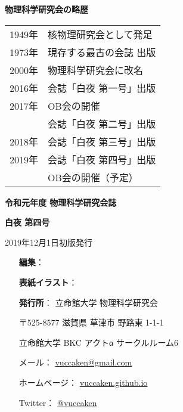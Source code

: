 \documentclass[10pt,b5paper,papersize,dvipdfmx]{jsbook}
\begin{document}

\markboth{}{} %
\clearpage %

\noindent
{\large \bfseries 物理科学研究会の略歴}
\begin{table}[H]
  \begin{tabular}{ll}
    1949年 & 核物理研究会として発足 \\
    1973年 & 現存する最古の会誌 出版 \\
    2000年 & 物理科学研究会に改名   \\
    2016年 & 会誌「白夜 第一号」出版 \\
    2017年 & OB会の開催           \\
          & 会誌「白夜 第二号」出版 \\
    2018年 & 会誌「白夜 第三号」出版 \\
    2019年 & 会誌「白夜 第四号」出版 \\
          & OB会の開催（予定）
  \end{tabular}
\end{table}

\vfill

{\bfseries 令和元年度 物理科学研究会誌}\par
{\large \bfseries 白夜 第四号}\vspace{-1zw}\\
\hrulefill \par
2019年12月1日\hspace{2zw}初版発行\par

\vspace{1.5zw}

\begin{minipage}{0.15\hsize}
    \hspace{1zw}
\end{minipage}
\begin{minipage}{0.7\hsize}
  \begin{itemize}
    \item[{\bfseries 編集}：] 
    \item[{\bfseries 表紙イラスト}：] 
    \item[{\bfseries 発行所}：] 立命館大学 物理科学研究会
    \item[ ] 〒525-8577 滋賀県 草津市 野路東 1-1-1
    \item[ ] 立命館大学 BKC アクトα サークルルーム6
    \item[ ] メール： \url{vuccaken@gmail.com}
    \item[ ] ホームページ： \url{vuccaken.github.io}
    \item[ ] Twitter： \url{@vuccaken}
  \end{itemize}
\end{minipage}

\par \vspace{0.5zw}
\hrulefill \par
\end{document}
